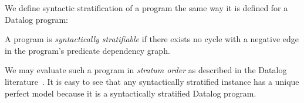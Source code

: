 
We define syntactic stratification of a \slang program the same way it is
defined for a Datalog program:

\begin{definition}
%
A \slang program is \emph{syntactically stratifiable} if there
exists no cycle with a negative edge 
in the program's
predicate dependency graph.
%
\end{definition}


We may evaluate such a program in {\em stratum order} as described in the
Datalog literature~\cite{ullmanbook}.
It is easy to see that any syntactically stratified \slang instance has a
unique perfect model  because it is a syntactically stratified Datalog program.

%
%

%

%

